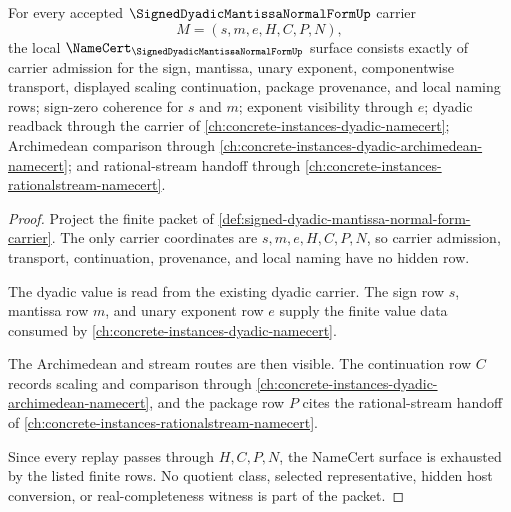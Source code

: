 \begin{theorem}
\label{thm:signed-dyadic-mantissa-normal-form-namecert-obligations}
For every accepted $\SignedDyadicMantissaNormalFormUp$ carrier
$$
M=(s,m,e,H,C,P,N),
$$
the local $\NameCert_{\SignedDyadicMantissaNormalFormUp}$ surface consists exactly of carrier admission for the sign, mantissa, unary exponent, componentwise transport, displayed scaling continuation, package provenance, and local naming rows; sign-zero coherence for $s$ and $m$; exponent visibility through $e$; dyadic readback through the carrier of \autoref{ch:concrete-instances-dyadic-namecert}; Archimedean comparison through \autoref{ch:concrete-instances-dyadic-archimedean-namecert}; and rational-stream handoff through \autoref{ch:concrete-instances-rationalstream-namecert}.
\end{theorem}
\begin{proof}
Project the finite packet of \autoref{def:signed-dyadic-mantissa-normal-form-carrier}. The only carrier coordinates are $s,m,e,H,C,P,N$, so carrier admission, transport, continuation, provenance, and local naming have no hidden row.

The dyadic value is read from the existing dyadic carrier. The sign row $s$, mantissa row $m$, and unary exponent row $e$ supply the finite value data consumed by \autoref{ch:concrete-instances-dyadic-namecert}.

The Archimedean and stream routes are then visible. The continuation row $C$ records scaling and comparison through \autoref{ch:concrete-instances-dyadic-archimedean-namecert}, and the package row $P$ cites the rational-stream handoff of \autoref{ch:concrete-instances-rationalstream-namecert}.

Since every replay passes through $H,C,P,N$, the NameCert surface is exhausted by the listed finite rows. No quotient class, selected representative, hidden host conversion, or real-completeness witness is part of the packet.
\end{proof}

